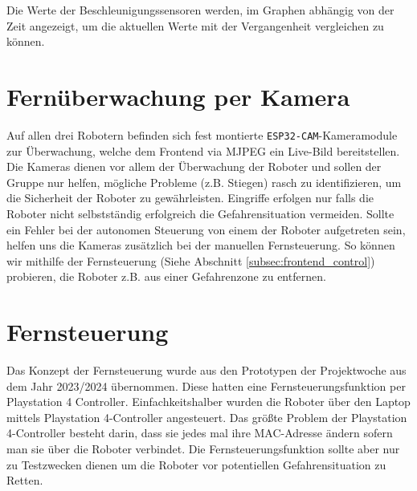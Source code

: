 Die Werte der Beschleunigungssensoren werden,
im Graphen abhängig von der Zeit angezeigt, 
um die aktuellen Werte mit der Vergangenheit vergleichen zu können.

\section{Fernüberwachung per Kamera}
\label{subsec:frontend_cam_stream}
Auf allen drei Robotern befinden sich fest montierte
\texttt{ESP32-CAM}-Kameramodule zur Überwachung,
welche dem Frontend via MJPEG ein Live-Bild bereitstellen.
%
Die Kameras dienen vor allem der Überwachung der Roboter und sollen der Gruppe nur helfen,
mögliche Probleme (z.B. Stiegen) rasch zu identifizieren,
um die Sicherheit der Roboter zu gewährleisten.
%
Eingriffe erfolgen nur falls die Roboter nicht selbstständig erfolgreich die Gefahrensituation vermeiden.
%
Sollte ein Fehler bei der autonomen Steuerung von einem der Roboter aufgetreten sein,
helfen uns die Kameras zusätzlich bei der manuellen Fernsteuerung.
%
So können wir mithilfe der Fernsteuerung (Siehe Abschnitt \ref{subsec:frontend_control}) probieren,
die Roboter z.B. aus einer Gefahrenzone zu entfernen.

\section{Fernsteuerung}
\label{subsec:frontend_control}
Das Konzept der Fernsteuerung wurde aus den Prototypen der Projektwoche aus dem Jahr 2023/2024 übernommen.
%
Diese hatten eine Fernsteuerungsfunktion per Playstation 4 Controller. Einfachkeitshalber wurden die Roboter über 
den Laptop mittels Playstation 4-Controller angesteuert. 
%
Das größte Problem der Playstation 4-Controller besteht darin, dass sie jedes mal ihre MAC-Adresse ändern sofern
man sie über die Roboter verbindet.  
%
Die Fernsteuerungsfunktion sollte aber nur zu Testzwecken dienen um die Roboter 
vor potentiellen Gefahrensituation zu Retten. 

